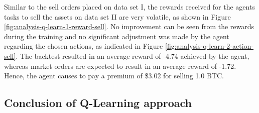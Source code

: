 Similar to the sell orders placed on data set I, the rewards received for the agents tasks to sell the assets on data set II are very volatile, as shown in Figure \ref{fig:analysis-q-learn-1-reward-sell}.
No improvement can be seen from the rewards during the training and no significant adjustment was made by the agent regarding the chosen actions, as indicated in Figure \ref{fig:analysis-q-learn-2-action-sell}.
The backtest resulted in an average reward of -4.74 achieved by the agent, whereas market orders are expected to result in an average reward of -1.72.
Hence, the agent causes to pay a premium of \$3.02 for selling 1.0 BTC.

\subsection{Conclusion of Q-Learning approach}

